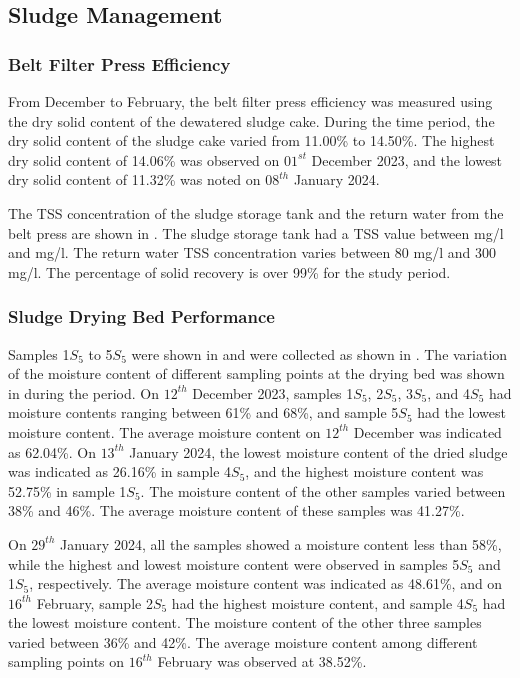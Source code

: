 \newpage
\subsection{Sludge Management}

\subsubsection{Belt Filter Press Efficiency}
From December to February, the belt filter press efficiency was measured using the dry solid content of the dewatered sludge cake. During the time period, the dry solid content of the sludge cake varied from 11.00\% to 14.50\%. The highest dry solid content of 14.06\% was observed on $01^{st}$ December 2023, and the lowest dry solid content of 11.32\% was noted on $08^{th}$ January 2024.

The \ac{TSS} concentration of the sludge storage tank and the return water from the belt press are shown in . The sludge storage tank had a \ac{TSS} value between  mg/l and  mg/l. The return water \ac{TSS} concentration varies between 80 mg/l and 300 mg/l. The percentage of solid recovery is over 99\% for the study period.






\subsubsection{Sludge Drying Bed Performance}
Samples 1$S_5$ to 5$S_5$ were shown in  and were collected as shown in .
The variation of the moisture content of different sampling points at the drying bed was shown in  during the period. On $12^{th}$ December 2023, samples 1$S_5$, 2$S_5$, 3$S_5$, and 4$S_5$ had moisture contents ranging between 61\% and 68\%, and sample 5$S_5$ had the lowest moisture content. The average moisture content on $12^{th}$ December was indicated as 62.04\%. On $13^{th}$ January 2024, the lowest moisture content of the dried sludge was indicated as 26.16\% in sample 4$S_5$, and the highest moisture content was 52.75\% in sample 1$S_5$. The moisture content of the other samples varied between 38\% and 46\%. The average moisture content of these samples was 41.27\%.

On $29^{th}$ January 2024, all the samples showed a moisture content less than 58\%, while the highest and lowest moisture content were observed in samples 5$S_5$ and 1$S_5$, respectively. The average moisture content was indicated as 48.61\%, and on $16^{th}$ February, sample 2$S_5$ had the highest moisture content, and sample 4$S_5$ had the lowest moisture content. The moisture content of the other three samples varied between 36\% and 42\%. The average moisture content among different sampling points on $16^{th}$ February was observed at 38.52\%.

